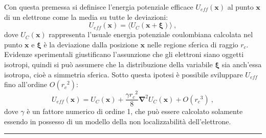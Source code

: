 \documentclass[12pt,a4paper]{report}
\numberwithin{equation}{section}
\numberwithin{section}{chapter}
\begin{document}
	Con questa premessa si definisce l'energia potenziale efficace $U_{eff}(\boldsymbol{x})$ al punto $\boldsymbol{x}$ di un elettrone come la media su tutte le deviazioni:
	\begin{equation}
	\label{corrda1}
	U_{eff}(\boldsymbol{x}) = \langle U_C(\boldsymbol{x} + \boldsymbol{\xi})\rangle~,
	\end{equation}
	dove $U_C(\boldsymbol{x})$ rappresenta l'usuale energia potenziale coulombiana calcolata nel punto $\boldsymbol{x}$ e $\boldsymbol{\xi}$ \`e la deviazione dalla posizione $\boldsymbol{x}$ nelle regione sferica di raggio $r_c$. Evidenze sperimentali giustificano l'assunzione che gli elettroni siano oggetti isotropi, quindi si pu\`o assumere che la distribuzione della variabile $\boldsymbol{\xi}$ sia anch'essa isotropa, cio\`e a simmetria sferica. Sotto questa ipotesi \`e possibile sviluppare $U_{eff}$ fino all'ordine $O({r_c}^2)$:
	\begin{equation}
	\label{corrda2}
	U_{eff}(\boldsymbol{x}) = U_C(\boldsymbol{x}) + \frac{\gamma {r_c}^2}{8}\boldsymbol{\nabla}^2U_C(\boldsymbol{x}) + O({r_c}^3)~,
	\end{equation}
	dove $\gamma$ \`e un fattore numerico di ordine 1, che pu\`o essere calcolato solamente essendo in possesso di un modello della non localizzabilit\`a dell'elettrone.\par
	\noindent\rule[0.1cm]{15.8cm}{0.1mm}
\end{document}
